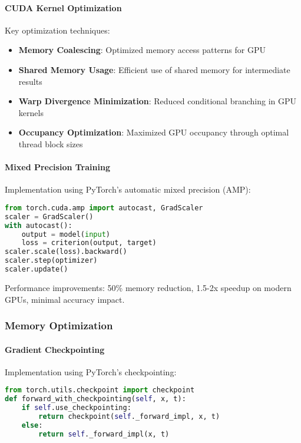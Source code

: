 \paragraph{CUDA Kernel Optimization}
Key optimization techniques:
\begin{itemize}
    \item \textbf{Memory Coalescing}: Optimized memory access patterns for GPU
    \item \textbf{Shared Memory Usage}: Efficient use of shared memory for intermediate results
    \item \textbf{Warp Divergence Minimization}: Reduced conditional branching in GPU kernels
    \item \textbf{Occupancy Optimization}: Maximized GPU occupancy through optimal thread block sizes
\end{itemize}

\paragraph{Mixed Precision Training}
Implementation using PyTorch's automatic mixed precision (AMP):

\begin{lstlisting}[language=python, caption=Mixed Precision Training]
from torch.cuda.amp import autocast, GradScaler
scaler = GradScaler()
with autocast():
    output = model(input)
    loss = criterion(output, target)
scaler.scale(loss).backward()
scaler.step(optimizer)
scaler.update()
\end{lstlisting}

Performance improvements: 50\% memory reduction, 1.5-2x speedup on modern GPUs, minimal accuracy impact.

\subsubsection{Memory Optimization}

\paragraph{Gradient Checkpointing}
Implementation using PyTorch's checkpointing:

\begin{lstlisting}[language=python, caption=Gradient Checkpointing]
from torch.utils.checkpoint import checkpoint
def forward_with_checkpointing(self, x, t):
    if self.use_checkpointing:
        return checkpoint(self._forward_impl, x, t)
    else:
        return self._forward_impl(x, t)
\end{lstlisting}

